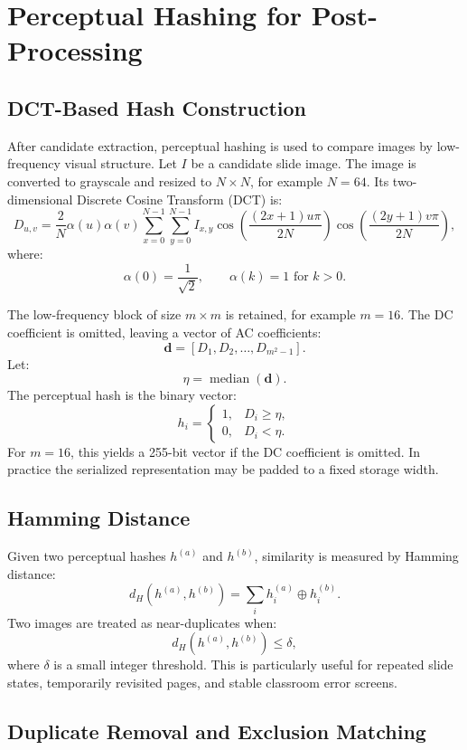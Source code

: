 \documentclass[11pt]{article}
\begin{document}
\section{Perceptual Hashing for Post-Processing}

\subsection{DCT-Based Hash Construction}

After candidate extraction, perceptual hashing is used to compare images by low-frequency visual structure. Let $I$ be a candidate slide image. The image is converted to grayscale and resized to $N \times N$, for example $N=64$. Its two-dimensional Discrete Cosine Transform (DCT) is:
\[
D_{u,v}
=
\frac{2}{N}\alpha(u)\alpha(v)
\sum_{x=0}^{N-1}\sum_{y=0}^{N-1}
I_{x,y}
\cos\left(\frac{(2x+1)u\pi}{2N}\right)
\cos\left(\frac{(2y+1)v\pi}{2N}\right),
\]
where:
\[
\alpha(0)=\frac{1}{\sqrt{2}}, \qquad \alpha(k)=1 \text{ for } k>0.
\]

The low-frequency block of size $m \times m$ is retained, for example $m=16$. The DC coefficient is omitted, leaving a vector of AC coefficients:
\[
\mathbf{d} = [D_1,D_2,\ldots,D_{m^2-1}].
\]
Let:
\[
\eta = \operatorname{median}(\mathbf{d}).
\]
The perceptual hash is the binary vector:
\[
h_i =
\begin{cases}
1, & D_i \ge \eta,\\
0, & D_i < \eta.
\end{cases}
\]
For $m=16$, this yields a 255-bit vector if the DC coefficient is omitted. In practice the serialized representation may be padded to a fixed storage width.

\subsection{Hamming Distance}

Given two perceptual hashes $h^{(a)}$ and $h^{(b)}$, similarity is measured by Hamming distance:
\[
d_H(h^{(a)},h^{(b)})
=
\sum_i h^{(a)}_i \oplus h^{(b)}_i.
\]
Two images are treated as near-duplicates when:
\[
d_H(h^{(a)},h^{(b)}) \le \delta,
\]
where $\delta$ is a small integer threshold. This is particularly useful for repeated slide states, temporarily revisited pages, and stable classroom error screens.

\subsection{Duplicate Removal and Exclusion Matching}
\end{document}
